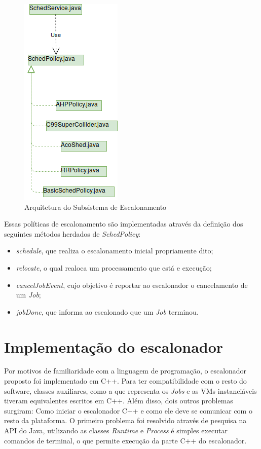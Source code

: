 \begin{figure}[htbp]
	\centerline{\includegraphics[scale=0.7]{img/ArquiteturaAntes.png}}
	\caption{Arquitetura do Subsistema de Escalonamento}
	\label{ArquiteturaAtual}
\end{figure}

Essas políticas de escalonamento são implementadas através da definição dos seguintes métodos herdados de \textit{SchedPolicy}:
\begin{itemize}
	\item \textit{schedule}, que realiza o escalonamento inicial propriamente dito;
	\item \textit{relocate}, o qual realoca um processamento que está e execução;
	\item \textit{cancelJobEvent}, cujo objetivo é reportar ao escalonador o cancelamento de um \textit{Job};
	\item \textit{jobDone}, que informa ao escalonado que um \textit{Job} terminou.
\end{itemize}


\section{Implementação do escalonador}

Por motivos de familiaridade com a linguagem de programação, o escalonador proposto foi implementado em C++. Para ter compatibilidade com o resto do software, classes auxiliares, como a que representa os \textit{Jobs} e as \acrshort{VM}s instanciáveis tiveram equivalentes escritos em C++. Além disso, dois outros problemas surgiram: Como iniciar o escalonador C++ e como ele deve se comunicar com o resto da plataforma. O primeiro problema foi resolvido através de pesquisa na \acrfull{API} do Java, utilizando as classes \textit{Runtime}\cite{JavaRuntime} e \textit{Process}\cite{JavaProcess} é simples executar comandos de terminal, o que permite execução da parte C++ do escalonador.

